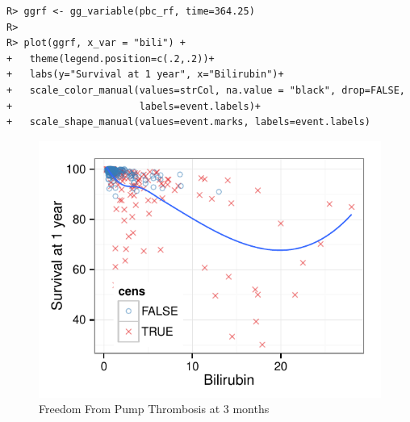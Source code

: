 \documentclass[nojss]{jss}\usepackage[]{graphicx}\usepackage[]{color}
\makeatletter
\def\maxwidth{ %
  \ifdim\Gin@nat@width>\linewidth
    \linewidth
  \else
    \Gin@nat@width
  \fi
}
\newenvironment{kframe}{%
 \def\at@end@of@kframe{}%
 \ifinner\ifhmode%
  \def\at@end@of@kframe{\end{minipage}}%
  \begin{minipage}{\columnwidth}%
 \fi\fi%
 \def\FrameCommand##1{\hskip\@totalleftmargin \hskip-\fboxsep
 \colorbox{shadecolor}{##1}\hskip-\fboxsep
     \hskip-\linewidth \hskip-\@totalleftmargin \hskip\columnwidth}%
 \MakeFramed {\advance\hsize-\width
   \@totalleftmargin\z@ \linewidth\hsize
   \@setminipage}}%
 {\par\unskip\endMakeFramed%
 \at@end@of@kframe}
\newenvironment{knitrout}{}{} %
\makeatother
\begin{document}
\begin{knitrout}\footnotesize
{}\color{fgcolor}\begin{kframe}
\begin{verbatim}
R> ggrf <- gg_variable(pbc_rf, time=364.25)
R> 
R> plot(ggrf, x_var = "bili") +
+   theme(legend.position=c(.2,.2))+
+   labs(y="Survival at 1 year", x="Bilirubin")+
+   scale_color_manual(values=strCol, na.value = "black", drop=FALSE,
+                      labels=event.labels)+
+   scale_shape_manual(values=event.marks, labels=event.labels)
\end{verbatim}
\end{kframe}\begin{figure}[!htpb]

{\centering \includegraphics[width=\maxwidth]{figure/rfs-variable-plotbili-1} 

}

\caption[Freedom From Pump Thrombosis at 3 months]{Freedom From Pump Thrombosis at 3 months\label{fig:variable-plotbili}}
\end{figure}


\end{knitrout}
\end{document}
